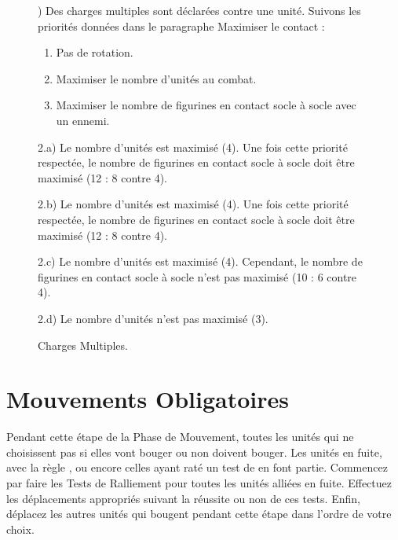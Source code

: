\begin{figure}[!htbp]
\begin{minipage}{0.5\textwidth}
\def\svgwidth{\textwidth}

\end{minipage}\hfill\begin{minipage}{0.47\textwidth}
\caption{Charges Multiples.}
\label{figure/multiplecharges}

\vspace*{10pt}
) Des charges multiples sont déclarées contre une unité. Suivons les priorités données dans le paragraphe Maximiser le contact :
\begin{enumerate}
\item Pas de rotation.
\item Maximiser le nombre d'unités au combat.
\item Maximiser le nombre de figurines en contact socle à socle avec un ennemi.
\end{enumerate}

\vspace*{10pt}
\noindent 2.a) Le nombre d'unités est maximisé (4). Une fois cette priorité respectée, le nombre de figurines en contact socle à socle doit être maximisé (12 : 8 contre 4).

\vspace*{10pt}
\noindent 2.b) Le nombre d'unités est maximisé (4). Une fois cette priorité respectée, le nombre de figurines en contact socle à socle doit être maximisé (12 : 8 contre 4).

\vspace*{10pt}
\noindent 2.c) Le nombre d'unités est maximisé (4). Cependant, le nombre de figurines en contact socle à socle n'est pas maximisé (10 : 6 contre 4).

\vspace*{10pt}
\noindent 2.d) Le nombre d'unités n'est pas maximisé (3).
\end{minipage}
\end{figure}

\newpage
\section{Mouvements Obligatoires}

Pendant cette étape de la Phase de Mouvement, toutes les unités qui ne choisissent pas si elles vont bouger ou non doivent bouger. Les unités en fuite, avec la règle \randommovement{}, ou encore celles ayant raté un test de \stupidity{} en font partie. Commencez par faire les Tests de Ralliement pour toutes les unités alliées en fuite. Effectuez les déplacements appropriés suivant la réussite ou non de ces tests. Enfin, déplacez les autres unités qui bougent pendant cette étape dans l'ordre de votre choix.

